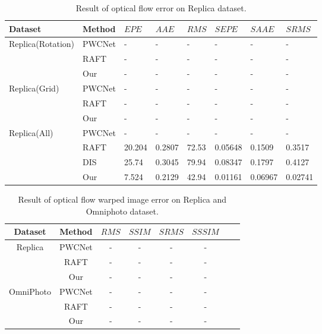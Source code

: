 \begin{table}[h!]
	\centering
	\caption{\label{fig:exp:oferrorquality}%
		Result of optical flow error on Replica dataset.}
	\begin{tabular}{p{2cm}p{1.2cm}p{1.2cm}p{1.2cm}p{1.2cm}p{1.2cm}p{1.2cm}p{1.2cm}}
		\hline
		 Dataset &  Method & ${EPE}$ & $AAE$ & $RMS$ & $SEPE$ & ${SAAE}$ & ${SRMS}$ \\
		\hline
		\multirow{3}{*}{Replica(Rotation)} & PWCNet & - & -  & - & - & -& - \\ 
		 & RAFT & - & -  & - & - & -& - \\ 
		 & Our & - & -  & - & - & -& - \\ 
		\hline
		\multirow{3}{*}{Replica(Grid)} & PWCNet & - & -  & - & - & -& - \\ 
		& RAFT & - & -  & - & - & -& - \\ 
		& Our & - & -  & - & - & -& - \\ 
		\hline
		\multirow{4}{*}{Replica(All)} & PWCNet & - & -  & - & - & - & - \\
		& RAFT & 20.204 & 0.2807  & 72.53  & 0.05648 & 0.1509  & 0.3517 \\
		& DIS  & 25.74  & 0.3045  & 79.94  & 0.08347 & 0.1797  & 0.4127 \\
		& Our  & 7.524  & 0.2129  &  42.94 & 0.01161 & 0.06967 & 0.02741 \\
		\hline
	\end{tabular}
\end{table}


\begin{table}[h!]
	\centering
	\caption{\label{fig:exp:warpingerrorquality}%
		Result of optical flow warped image error on Replica and Omniphoto dataset.}
	\begin{tabular}{c c c c c c c c}
		\hline
		Dataset &  Method & ${RMS}$ & $SSIM$ & $SRMS$ & $SSSIM$ \\
		\hline
		\multirow{3}{*}{Replica} & PWCNet & - & -  & - & - \\ 
		& RAFT & - & -  & - & - \\ 
		& Our & - & -  & - & -  \\ 
		\hline
		\multirow{3}{*}{OmniPhoto} & PWCNet & - & -  & - & - \\ 
		& RAFT & - & -  & - & - \\ 
		& Our & - & -  & - & - \\ 
		\hline
	\end{tabular}
\end{table}



